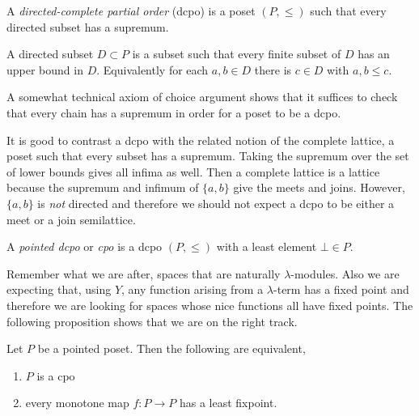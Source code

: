\documentclass[12pt]{article}
\begin{document}
\begin{defn}
A \textit{directed-complete partial order} (dcpo) is a poset $(P, \le)$ such that every directed subset has a supremum. 
\end{defn}

\begin{rmk}
A directed subset $D \subset P$ is a subset such that every finite subset of $D$ has an upper bound in $D$. Equivalently for each $a, b \in D$ there is $c \in D$ with $a,b \le c$. 
\end{rmk}

\begin{rmk}
A somewhat technical axiom of choice argument shows that it suffices to check that every chain has a supremum in order for a poset to be a dcpo. 
\end{rmk}

\begin{rmk}
It is good to contrast a dcpo with the related notion of the complete lattice, a poset such that every subset has a supremum. Taking the supremum over the set of lower bounds gives all infima as well. Then a complete lattice is a lattice because the supremum and infimum of $\{ a, b \}$ give the meets and joins. However, $\{ a, b \}$ is \textit{not} directed and therefore we should not expect a dcpo to be either a meet or a join semilattice.  
\end{rmk}

\begin{defn}
A \textit{pointed dcpo} or \textit{cpo} is a dcpo $(P, \le)$ with a least element $\bot \in P$.
\end{defn}

\begin{rmk}
Remember what we are after, spaces that are naturally $\lambda$-modules. Also we are expecting that, using $Y$, any function arising from a $\lambda$-term has a fixed point and therefore we are looking for spaces whose nice functions all have fixed points. The following proposition shows that we are on the right track. 
\end{rmk}

\begin{prop}
Let $P$ be a pointed poset. Then the following are equivalent,
\begin{enumerate}
\item $P$ is a cpo
\item every monotone map $f : P \to P$ has a least fixpoint.  
\end{enumerate}
\end{prop}
\end{document}
